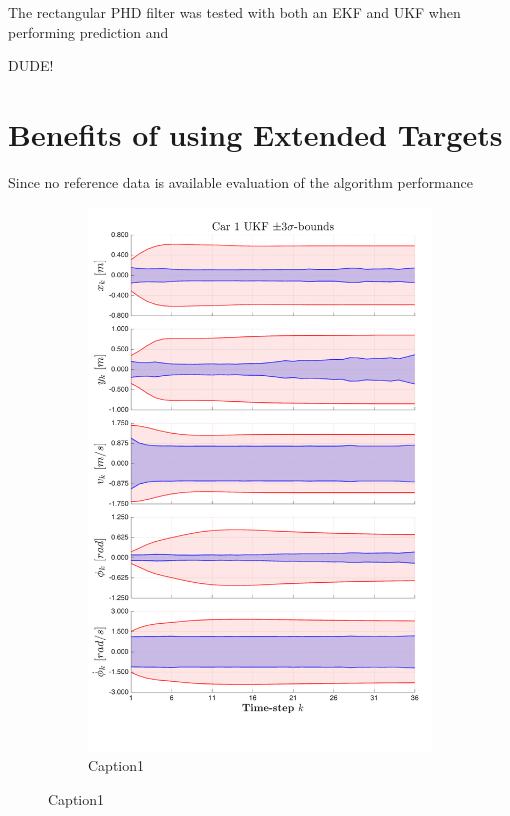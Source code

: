 The rectangular PHD filter was tested with both an EKF and UKF when performing prediction and 


DUDE!

\section{Benefits of using Extended Targets}
Since no reference data is available evaluation of the algorithm performance 


\begin{figure}[ht]
    \begin{subfigure}{0.48\textwidth}
    \includegraphics[width=0.9\linewidth]{include/images/car1.png} 
    \caption{Caption1}
    \label{fig:subim1}
    \end{subfigure}

\end{figure}
